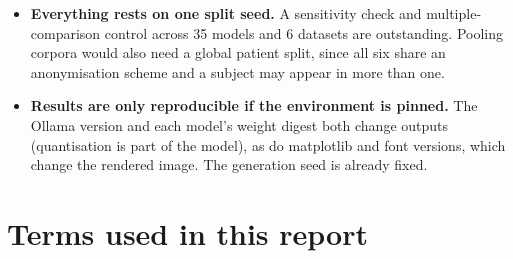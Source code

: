 \documentclass[11pt,a4paper]{article}
\begin{document}
\begin{itemize}
      image-deterministically: on retry, previously failed images failed again at
      72--82\% against 42\% on first exposure, so each pass recovers about a fifth
      of the remainder and never converges.
\item \textbf{Everything rests on one split seed.} A sensitivity check and
      multiple-comparison control across 35 models and 6 datasets are outstanding.
      Pooling corpora would also need a global patient split, since all six share
      an anonymisation scheme and a subject may appear in more than one.
\item \textbf{Results are only reproducible if the environment is pinned.} The
      Ollama version and each model's weight digest both change outputs
      (quantisation is part of the model), as do matplotlib and font versions,
      which change the rendered image. The generation seed is already fixed.
\end{itemize}

\clearpage
\appendix
\section{Terms used in this report}
\end{document}
